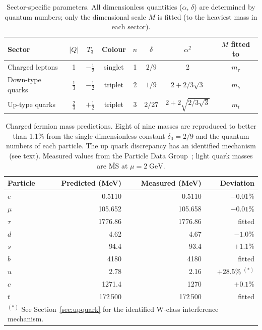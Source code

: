 \documentclass{article}
\begin{document}
\begin{table}[t]
  \centering
  \caption{Sector-specific parameters. All dimensionless quantities ($\alpha$, $\delta$) are determined by quantum numbers; only the dimensional scale $M$ is fitted (to the heaviest mass in each sector).}
  \label{tab:inputs}
  \begin{tabular}{lccccccc}
    \toprule
    Sector & $|Q|$ & $T_3$ & Colour & $n$ & $\delta$ & $\alpha^2$ & $M$ fitted to \\
    \midrule
    Charged leptons & 1 & $-\tfrac{1}{2}$ & singlet & 1 & $2/9$ & 2 & $m_\tau$ \\
    Down-type quarks & $\tfrac{1}{3}$ & $-\tfrac{1}{2}$ & triplet & 2 & $1/9$ & $2 + 2/3\sqrt{3}$ & $m_b$ \\
    Up-type quarks & $\tfrac{2}{3}$ & $+\tfrac{1}{2}$ & triplet & 3 & $2/27$ & $2 + 2\sqrt{2/3\sqrt{3}}$ & $m_t$ \\
    \bottomrule
  \end{tabular}
\end{table}

\begin{table}[t]
  \centering
  \caption{Charged fermion mass predictions. Eight of nine masses are reproduced to better than 1.1\% from the single dimensionless constant $\delta_0 = 2/9$ and the quantum numbers of each particle. The up quark discrepancy has an identified mechanism (see text). Measured values from the Particle Data Group~\autocite{PDG2024}; light quark masses are $\overline{\mathrm{MS}}$ at $\mu = 2\;\mathrm{GeV}$.}
  \label{tab:masses}
  \begin{tabular}{lrrr}
    \toprule
    Particle & Predicted (MeV) & Measured (MeV) & Deviation \\
    \midrule
    $e$ & 0.5110 & 0.5110 & $-0.01\%$ \\
    $\mu$ & 105.652 & 105.658 & $-0.01\%$ \\
    $\tau$ & 1776.86 & 1776.86 & fitted \\[4pt]
    $d$ & 4.62 & 4.67 & $-1.0\%$ \\
    $s$ & 94.4 & 93.4 & $+1.1\%$ \\
    $b$ & 4180 & 4180 & fitted \\[4pt]
    $u$ & 2.78 & 2.16 & $+28.5\%\;^{(*)}$ \\
    $c$ & 1271.4 & 1270 & $+0.1\%$ \\
    $t$ & 172\,500 & 172\,500 & fitted \\
    \bottomrule
    \multicolumn{4}{l}{\footnotesize $^{(*)}$ See Section~\ref{sec:upquark} for the identified W-class interference mechanism.}
  \end{tabular}
\end{table}
\end{document}
